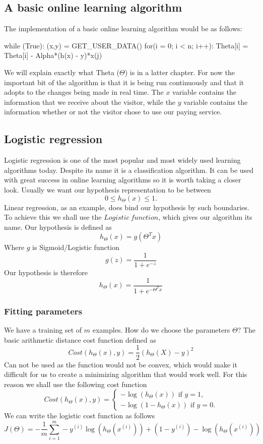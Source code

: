 \documentclass[journal]{IEEEtran/IEEEtran}
\begin{document}
\subsection{A basic online learning algorithm}
The implementation of a basic online learning algorithm would be as follows:
\begin{code}
while (True):
  (x,y) = GET_USER_DATA()
  for(i = 0; i < n; i++):
    Theta[i] = Theta[i] - Alpha*(h(x) - y)*x(j) 
\end{code} 

We will explain exactly what Theta ($\Theta$) is in a latter chapter. For now the important bit of the algorithm is that it is being run continuously and that it adopts to the changes being made in real time. The $x$ variable contains the information that we receive about the visitor, while the $y$ variable contains the information whether or not the visitor chose to use our paying service.
\subsection{Logistic regression}
Logistic regression is one of the most popular and most widely used learning algorithms today. Despite its name it is a classification algorithm. It can be used with great success in online learning algorithms so it is worth taking a closer look. Usually we want our hypothesis representation to be between  
$$ 0 \le h_\Theta (x) \le 1. $$ 
Linear regression, as an example, does bind our hypothesis by such boundaries. To achieve this we shall use the $Logistic\ function$, which gives our algorithm its name. Our hypothesis is defined as
$$ h_\Theta (x) = g(\Theta^{T}x)$$
Where $g$ is Sigmoid/Logistic function
$$ g(z) = \frac{1}{1+e^{-z}} $$
Our hypothesis is therefore
$$ h_\Theta (x) = \frac{1}{1+e^{-\Theta^{T}x}} $$
\subsubsection*{Fitting parameters}
We have a training set of $m$ examples. How do we choose the parameters $\Theta$?
The basic arithmetic distance cost function defined as
$$ Cost(h_\Theta (x), y) = \frac{1}{2}(h_\Theta (X) - y)^{2} $$
Can not be used as the function would not be convex, which would make it difficult for us to create a minimizing algorithm that would work well. For this reason we shall use the following cost function
\begin{equation*}
Cost(h_\Theta (x), y) =
\begin{cases}
-\log{(h_\Theta (x))} \text{ if $y=1$,}
\\
-\log{(1 - h_\Theta (x))} \text{ if $y=0$.}
\end{cases}
\end{equation*}
We can write the logistic cost function as follows
$$ J(\Theta) = -\frac{1}{m}\displaystyle\sum\limits_{i=1}^m 
-y^{(i)}\log{(h_\Theta (x^{(i)}))} + (1-y^{(i)}) -\log{(h_\Theta (x^{(i)}))} $$
\end{document}
